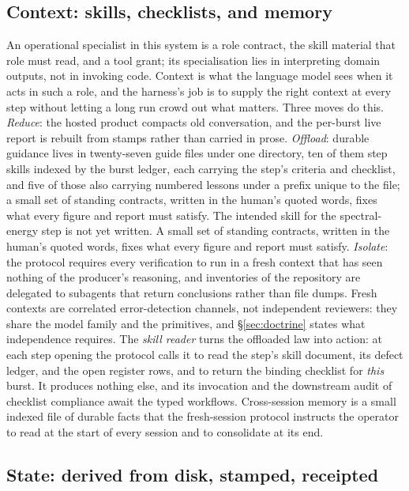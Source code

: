 \subsection{Context: skills, checklists, and memory} \label{sec:context}\label{sec:roster}

An operational specialist in this system is a role contract, the skill
material that role must read, and a tool grant; its specialisation lies in
interpreting domain outputs, not in invoking code. Context is what the
language model sees when it acts in such a role, and the harness's job is
to supply the right context at every step without letting a long run crowd
out what matters. Three moves do this. \emph{Reduce}: the hosted product
compacts old conversation, and the per-burst live report is rebuilt from
stamps rather than carried in prose. \emph{Offload}: durable guidance lives
in twenty-seven guide files\prov{} under one directory, ten of them step
skills indexed by the burst ledger, each carrying the step's criteria and
checklist, and five of those also carrying numbered lessons under a prefix
unique to the file; a small
set of standing contracts, written in the human's quoted words, fixes what
every figure and report must satisfy. The intended skill for the
spectral-energy step is not yet written. A small
set of standing contracts, written in the human's quoted words, fixes what
every figure and report must satisfy. \emph{Isolate}: the protocol requires
every verification to run in a fresh context that has seen nothing of the
producer's reasoning, and inventories of the repository are delegated to
subagents that return conclusions rather than file dumps. Fresh contexts
are correlated error-detection channels, not independent reviewers: they
share the model family and the primitives, and \S\ref{sec:doctrine} states
what independence requires. The \emph{skill reader} turns the offloaded law
into action: at each step opening the protocol calls it to read the step's
skill document, its defect ledger, and the open register rows, and to
return the binding checklist for \emph{this} burst. It produces nothing
else, and its invocation and the downstream audit of checklist compliance
await the typed workflows. Cross-session memory is a small indexed file of
durable facts that the fresh-session protocol instructs the operator to
read at the start of every session and to consolidate at its end.

\subsection{State: derived from disk, stamped, receipted} \label{sec:state}\label{sec:skeleton}

